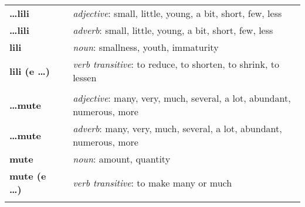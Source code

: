 \begin{supertabular}{p{2,5cm}|ll}
\textbf{\dots lili} && \textit{adjective}: small, little, young, a bit, short, few, less \\ %
\textbf{\dots lili} && \textit{adverb}: small, little, young, a bit, short, few, less \\ %
\textbf{lili} && \textit{noun}: smallness, youth, immaturity \\ %
\textbf{lili (e \dots)} && \textit{verb transitive}: to reduce, to shorten, to shrink, to lessen \\ %
 && \\ %
\textbf{\dots mute} && \textit{adjective}: many, very, much, several, a lot, abundant, numerous, more \\ %
\textbf{\dots mute} && \textit{adverb}: many, very, much, several, a lot, abundant, numerous, more \\ %
\textbf{mute} && \textit{noun}: amount, quantity \\ %
\textbf{mute (e \dots)} && \textit{verb transitive}: to make many or much \\ %
 && \\ %

\end{supertabular}
